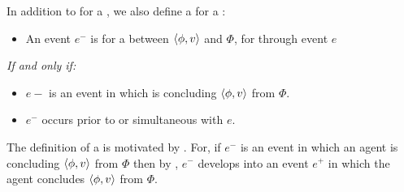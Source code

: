 \begin{note}
  In addition to \wit{} for a \ros{}, we also define a \pwit{} for a \ros{}:

  \begin{definition}
    \label{def:Pwit}%
    \vspace{-\baselineskip}
    \begin{itemize}
    \item
      An event \(e^{-}\) is \emph{} for a \ros{} between \(\langle \phi, v \rangle\) and \(\Phi\), for \vAgent{} through event \(e\)
    \end{itemize}

    \emph{If and only if:}

    \begin{itemize}
    \item
      \(e-\) is an event in which \vAgent{} is concluding \(\langle \phi, v \rangle\) from \(\Phi\).
    \item
      \(e^{-}\) occurs prior to or simultaneous with \(e\).
    \end{itemize}
    \vspace{-\baselineskip}
  \end{definition}

  \noindent%
  The definition of a \pwit{} is motivated by \assuPP{}.
  For, if \(e^{-}\) is an event in which an agent is concluding \(\langle \phi, v \rangle\) from \(\Phi\) then by \assuPP{}, \(e^{-}\) develops into an event \(e^{+}\) in which the agent concludes \(\langle \phi, v \rangle\) from \(\Phi\).
\end{note}


\section{\supportII{}}
\label{cha:ros:II}

